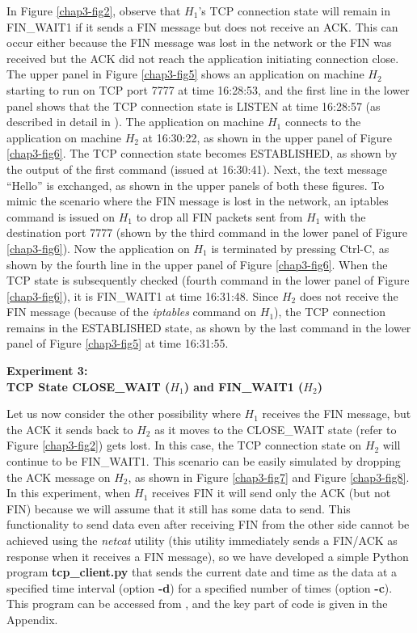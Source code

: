\begin{multicols}{2}
In Figure \ref{chap3-fig2}, observe that $H_{1}$'s TCP connection state will remain in FIN\_WAIT1 if it sends a FIN message but does not receive an ACK. This can occur either because the FIN message was lost in the network or the FIN was received but the ACK did not reach the application initiating connection close. The upper panel in Figure \ref{chap3-fig5} shows an application on machine $H_{2}$ starting to run on TCP port 7777 at time 16:28:53, and the first line in the lower panel shows that the TCP connection state is LISTEN at time 16:28:57 (as described in detail in \cite{chap3-key8}). The application on machine $H_{1}$ connects to the application on machine $H_{2}$ at 16:30:22, as shown in the upper panel of Figure \ref{chap3-fig6}. The TCP connection state becomes ESTABLISHED, as shown by the output of the first command (issued at 16:30:41). Next, the text message ``Hello'' is exchanged, as shown in the upper panels of both these figures. To mimic the scenario where the FIN message is lost in the network, an iptables command is issued on $H_{1}$ to drop all FIN packets sent from $H_{1}$ with the destination port 7777 (shown by the third command in the lower panel of Figure \ref{chap3-fig6}). Now the application on $H_{1}$ is terminated by pressing Ctrl-C, as shown by the fourth line in the upper panel of Figure \ref{chap3-fig6}. When the TCP state is subsequently checked (fourth command in the lower panel of Figure \ref{chap3-fig6}), it is FIN\_WAIT1 at time 16:31:48. Since $H_{2}$ does not receive the FIN message (because of the \textit{iptables} command on $H_{1}$), the TCP connection remains in the ESTABLISHED state, as shown by the last command in the lower panel of Figure \ref{chap3-fig5} at 	time 16:31:55.

\medskip
\noindent
\textbf{Experiment 3:\\ TCP State CLOSE\_WAIT (\boldmath$H_{1}$) and FIN\_WAIT1 ($H_{2}$)}
\smallskip

Let us now consider the other possibility where $H_{1}$ receives the FIN message, but the ACK it sends back to $H_{2}$ as it moves to the CLOSE\_WAIT state (refer to Figure \ref{chap3-fig2}) gets lost. In this case, the TCP connection state on $H_{2}$ will continue to be FIN\_WAIT1. This scenario can be easily simulated by dropping the ACK message on $H_{2}$, as shown in Figure \ref{chap3-fig7} and Figure \ref{chap3-fig8}. In this experiment, when $H_{1}$ receives FIN it will send only the ACK (but not FIN) because we will assume that it still has some data to send. This functionality to send data even after receiving FIN from the other side cannot be achieved using the \textit{netcat} utility (this utility immediately sends a FIN/ACK as response when it receives a FIN message), so we have developed a simple Python program \textbf{tcp\_client.py} that sends the current date and time as the data at a specified time interval (option \textbf{-d}) for a specified number of times (option \textbf{-c}). This program can be accessed from \cite{chap3-key10}, and the key part of code is given in the Appendix.
\end{multicols}


